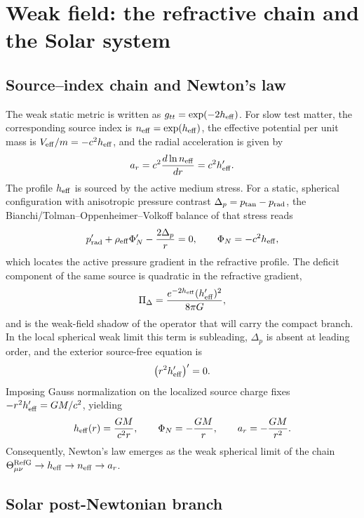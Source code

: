 \documentclass[12pt,a4paper]{article}
\begin{document}
\section{Weak field: the refractive chain and the Solar system}
\label{sec:weak}

\subsection{Source--index chain and Newton's law}
\label{sec:newton}

The weak static metric is written as $g_{tt}=\exp(-2h_{\rm eff})$. For slow
test matter, the corresponding source index is $n_{\rm eff}=\exp(h_{\rm eff})$,
the effective potential per unit mass is $V_{\rm eff}/m=-c^2h_{\rm eff}$, and
the radial acceleration is given by
\[
a_r=c^2\frac{d\ln n_{\rm eff}}{dr}=c^2h_{\rm eff}' .
\]
The profile $h_{\rm eff}$ is sourced by the active medium stress. For a
static, spherical configuration with anisotropic pressure contrast
$\Delta_p=p_{\rm tan}-p_{\rm rad}$, the Bianchi/Tolman--Oppenheimer--Volkoff
balance of that stress reads
\[
p_{\rm rad}'+\rho_{\rm eff}\Phi_N'-\frac{2\Delta_p}{r}=0,
\qquad \Phi_N=-c^2h_{\rm eff},
\]
which locates the active pressure gradient in the refractive profile. The
deficit component of the same source is quadratic in the refractive gradient,
\[
\Pi_\Delta=\frac{e^{-2h_{\rm eff}}(h_{\rm eff}')^2}{8\pi G},
\]
and is the weak-field shadow of the operator that will carry the compact
branch. In the local spherical weak limit this term is subleading, $\Delta_p$
is absent at leading order, and the exterior source-free equation is
\[
\left(r^2h_{\rm eff}'\right)'=0 .
\]
Imposing Gauss normalization on the localized source charge fixes
$-r^2h_{\rm eff}'=GM/c^2$, yielding
\[
h_{\rm eff}(r)=\frac{GM}{c^2r},\qquad
\Phi_N=-\frac{GM}{r},\qquad
a_r=-\frac{GM}{r^2}.
\]
Consequently, Newton's law emerges as the weak spherical limit of the chain
$\Theta^{\rm RefG}_{\mu\nu}\to h_{\rm eff}\to n_{\rm eff}\to a_r$.

\subsection{Solar post-Newtonian branch}
\label{sec:solar}
\end{document}
